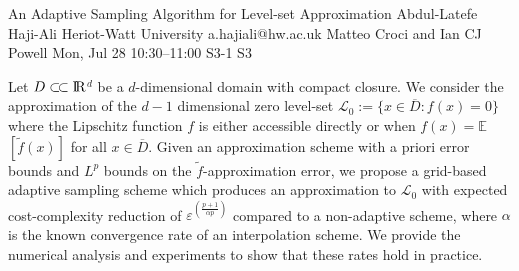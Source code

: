\begin{talk}
  {An Adaptive Sampling Algorithm for Level-set Approximation}%
  {Abdul-Latefe Haji-Ali}%
  {Heriot-Watt University}%
  {a.hajiali@hw.ac.uk}%
  {Matteo Croci and Ian CJ Powell}%
  {}%
  {Mon, Jul 28 10:30--11:00}%
  {S3-1}%
  {S3}%
  {}%
    

  Let $D\subset\joinrel\subset\rm{I\!R}$$^d$ be a $d$-dimensional domain with compact
closure. We consider the approximation of the $d-1$ dimensional zero level-set
$\mathcal{L}_0 := \{x \in \overline{D} : f(x) = 0\}$ where the Lipschitz function $f$ is either
accessible directly or when $f(x) = \mathbb{E}$$\left[\tilde{f}(x)\right]$ for
all $x \in \overline{D}$. Given an approximation scheme with a priori error bounds
and $L^p$ bounds on the $\tilde{f}$-approximation error, we propose a
grid-based adaptive sampling scheme which produces an approximation to $\mathcal{L}_0$
with expected cost-complexity reduction of $\varepsilon^{\left(\frac{p+1}{\alpha p}\right)}$
compared to a non-adaptive scheme, where $\alpha$ is the known convergence rate of
an interpolation scheme. We provide the numerical analysis and experiments to
show that these rates hold in practice.

\medskip


\end{talk}

